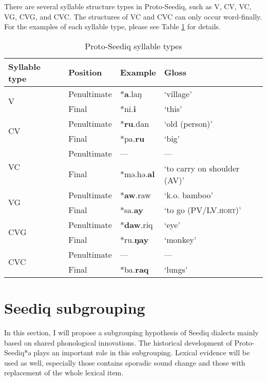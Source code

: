 \documentclass[12pt]{article}
\newcommand{\psedf}{Proto-Seediq\xspace}
\begin{document}
There are several syllable structure types in \psedf, such as V, CV, VC, VG, CVG, and CVC. The structures of VC and CVC can only occur word-finally. For the examples of each syllable type, please see Table \ref{tab:syltype} for details. 

\begin{table}[!htbp]
\centering
\caption{\psedf syllable types}
\label{tab:syltype}
\begin{tabular}{llll}
\hline
Syllable type        & Position & Example   & Gloss                       \\ \hline
\multirow{2}{*}{V}   & Penultimate  & *\textbf{a}.laŋ    & `village'                   \\
                     & Final    & *ni.\textbf{i}     & `this'                      \\\hline  
\multirow{2}{*}{CV}  & Penultimate  & *\textbf{ru}.dan   & `old (person)'              \\
                     & Final    & *pa.\textbf{ru}    & `big'                       \\\hline  
\multirow{2}{*}{VC}  & Penultimate  & ---        & ---                         \\
                     & Final    & *mə.hə.\textbf{al} & `to carry on shoulder (AV)' \\\hline  
\multirow{2}{*}{VG}  & Penultimate  & *\textbf{aw}.raw        & `k.o. bamboo'                        \\
                     & Final    & *sa.\textbf{ay} & `to go (PV/LV.\textsc{hort})' \\\hline  
\multirow{2}{*}{CVG} & Penultimate  & *\textbf{daw}.riq  & `eye'                       \\
                     & Final    & *ru.\textbf{ŋay}   & `monkey'                    \\\hline  
\multirow{2}{*}{CVC} & Penultimate  & ---        & ---                          \\
                     & Final    & *ba.\textbf{raq}   & `lungs'         \\ \hline           
\end{tabular}
\end{table}

\section{Seediq subgrouping} \label{subgrouping}

In this section, I will propose a subgrouping hypothesis of Seediq dialects mainly based on shared phonological innovations. The historical development of \psedf *ə plays an important role in this subgrouping. Lexical evidence will be used as well, especially those contains sporadic sound change and those with replacement of the whole lexical item. 
\end{document}
